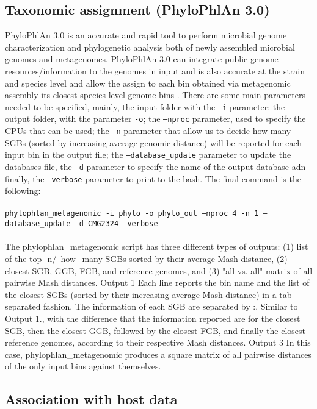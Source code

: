 \documentclass[a4paper,titlepage]{book}
\newcommand{\code}[1]{\colorbox{light-gray}{\texttt{#1}}}
\begin{document}
\subsection{Taxonomic assignment (PhyloPhlAn 3.0)}

PhyloPhlAn 3.0 is an accurate and rapid tool to perform microbial genome characterization and phylogenetic analysis both of newly assembled microbial genomes and metagenomes. PhyloPhlAn 3.0 can integrate public genome resources/information to the genomes in input and is also accurate at the strain and species level and allow the assign to each bin obtained via metagenomic assembly its closest species-level genome bins \cite{Phylo}.
There are some main parameters needed to be specified, mainly, the input folder with the \code{-i} parameter; the output folder, with the parameter \code{-o}; the \code{--nproc} parameter, used to specify the CPUs that can be used; the \code{-n} parameter that allow us to decide  how many SGBs (sorted by increasing average genomic distance) will be reported for each input bin in the output file; the \code{--database\_update} parameter to update the databases file, the \code{-d} parameter to specify the name of the output database adn finally, the \code{--verbose} parameter to print to the bash.
The final command is the following:\\ \newline \\ \code{phylophlan\_metagenomic -i phylo -o phylo\_out --nproc 4 -n 1 --database\_update -d CMG2324 --verbose}
\\
\newline
\\
The phylophlan\_metagenomic script has three different types of outputs: (1) list of the top -n/--how\_many SGBs sorted by their average Mash distance, (2) closest SGB, GGB, FGB, and reference genomes, and (3) "all vs. all" matrix of all pairwise Mash distances.
Output 1
Each line reports the bin name and the list of the closest SGBs (sorted by their increasing average Mash distance) in a tab-separated fashion. The information of each SGB are separated by :.
Similar to Output 1., with the difference that the information reported are for the closest SGB, then the closest GGB, followed by the closest FGB, and finally the closest reference genomes, according to their respective Mash distances.
Output 3
In this case, phylophlan\_metagenomic produces a square matrix of all pairwise distances of the only input bins against themselves.


\subsection{Association with host data}
\end{document}
